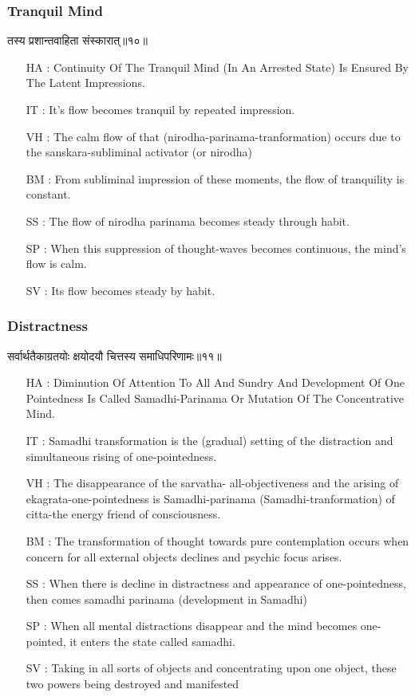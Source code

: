 \begin{frame}[fragile]\frametitle{Tranquil Mind}
\begin{sanskrit}
तस्य प्रशान्तवाहिता संस्कारात्॥१०॥
\end{sanskrit}

	\begin{itemize}
	\item [HA]: Continuity Of The Tranquil Mind (In An Arrested State) Is Ensured By The Latent Impressions.
	\item [IT]: It’s flow becomes tranquil by repeated impression.
	\item [VH]: The calm flow of that (nirodha-parinama-tranformation) occurs due to the sanskara-subliminal activator (or nirodha)
	\item [BM]: From subliminal impression of these moments, the flow of tranquility is constant.
	\item [SS]: The flow of nirodha parinama becomes steady through habit.
	\item [SP]: When this suppression of thought-waves becomes continuous, the mind’s flow is calm.
	\item [SV]: Its flow becomes steady by habit. 
	\end{itemize}
\end{frame}



\begin{frame}[fragile]\frametitle{Distractness}
\begin{sanskrit}
सर्वार्थतैकाग्रतयोः क्षयोदयौ चित्तस्य समाधिपरिणामः॥११॥
\end{sanskrit}

	\begin{itemize}
	\item [HA]: Diminution Of Attention To All And Sundry And Development Of One Pointedness Is Called Samadhi-Parinama Or Mutation Of The Concentrative Mind.
	\item [IT]: Samadhi transformation is the (gradual) setting of the distraction and simultaneous rising of one-pointedness.
	\item [VH]: The disappearance of the sarvatha- all-objectiveness and the arising of ekagrata-one-pointedness is Samadhi-parinama (Samadhi-tranformation) of citta-the energy friend of consciousness.
	\item [BM]: The transformation of thought towards pure contemplation occurs when concern for all external objects declines and psychic focus arises.
	\item [SS]: When there is decline in distractness and appearance of one-pointedness, then comes samadhi parinama (development in Samadhi)
	\item [SP]: When all mental distractions disappear and the mind becomes one-pointed, it enters the state called samadhi.
	\item [SV]: Taking in all sorts of objects and concentrating upon one object, these two powers being destroyed and manifested 
	\end{itemize}
\end{frame}


